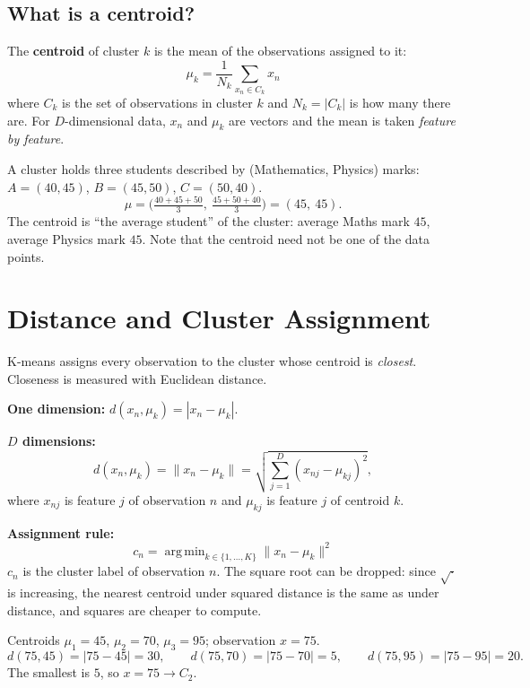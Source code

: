 \documentclass[11pt,a4paper]{article}
\DeclareMathOperator*{\argmin}{arg\,min}
\begin{document}
\subsection{What is a centroid?}

The \textbf{centroid} of cluster $k$ is the mean of the observations assigned to it:
\[
\boxed{\;\mu_k=\frac{1}{N_k}\sum_{x_n\in C_k}x_n\;}
\]
where $C_k$ is the set of observations in cluster $k$ and $N_k=|C_k|$ is how many there are. For $D$-dimensional data, $x_n$ and $\mu_k$ are vectors and the mean is taken \emph{feature by feature}.

\begin{example}
A cluster holds three students described by (Mathematics, Physics) marks:
$A=(40,45)$, $B=(45,50)$, $C=(50,40)$.
\[
\mu=\Big(\tfrac{40+45+50}{3},\ \tfrac{45+50+40}{3}\Big)=(45,\ 45).
\]
The centroid is ``the average student'' of the cluster: average Maths mark $45$, average Physics mark $45$. Note that the centroid need not be one of the data points.
\end{example}

\section{Distance and Cluster Assignment}

K-means assigns every observation to the cluster whose centroid is \emph{closest}. Closeness is measured with Euclidean distance.

\textbf{One dimension:} $d(x_n,\mu_k)=|x_n-\mu_k|$.

\textbf{$D$ dimensions:}
\[
d(x_n,\mu_k)=\|x_n-\mu_k\|=\sqrt{\sum_{j=1}^D(x_{nj}-\mu_{kj})^2},
\]
where $x_{nj}$ is feature $j$ of observation $n$ and $\mu_{kj}$ is feature $j$ of centroid $k$.

\textbf{Assignment rule:}
\[
\boxed{\;c_n=\argmin_{k\in\{1,\dots,K\}}\|x_n-\mu_k\|^2\;}
\]
$c_n$ is the cluster label of observation $n$. The square root can be dropped: since $\sqrt{\cdot}$ is increasing, the nearest centroid under squared distance is the same as under distance, and squares are cheaper to compute.

\begin{example}
Centroids $\mu_1=45$, $\mu_2=70$, $\mu_3=95$; observation $x=75$.
\[
d(75,45)=|75-45|=30,\qquad d(75,70)=|75-70|=5,\qquad d(75,95)=|75-95|=20.
\]
The smallest is $5$, so $x=75\to C_2$.
\end{example}
\end{document}
